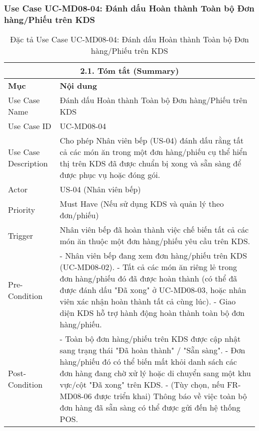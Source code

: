 \subsubsection{Use Case UC-MD08-04: Đánh dấu Hoàn thành Toàn bộ Đơn hàng/Phiếu trên KDS}
\begin{longtable}{|m{4cm}|p{11cm}|}
\caption{Đặc tả Use Case UC-MD08-04: Đánh dấu Hoàn thành Toàn bộ Đơn hàng/Phiếu trên KDS} \label{tab:uc_md08_04_final_v2} \\
\hline
\multicolumn{2}{|c|}{\textbf{2.1. Tóm tắt (Summary)}} \\
\hline
\textbf{Mục} & \textbf{Nội dung} \\
\hline
\endhead %
\hline
\endfoot %
\hline
\endlastfoot %
Use Case Name & Đánh dấu Hoàn thành Toàn bộ Đơn hàng/Phiếu trên KDS \\
\hline
Use Case ID & UC-MD08-04 \\
\hline
Use Case Description & Cho phép Nhân viên bếp (US-04) đánh dấu rằng tất cả các món ăn trong một đơn hàng/phiếu cụ thể hiển thị trên KDS đã được chuẩn bị xong và sẵn sàng để được phục vụ hoặc đóng gói. \\
\hline
Actor & US-04 (Nhân viên bếp) \\
\hline
Priority & Must Have (Nếu sử dụng KDS và quản lý theo đơn/phiếu) \\
\hline
Trigger & Nhân viên bếp đã hoàn thành việc chế biến tất cả các món ăn thuộc một đơn hàng/phiếu yêu cầu trên KDS. \\
\hline
Pre-Condition & - Nhân viên bếp đang xem đơn hàng/phiếu trên KDS (UC-MD08-02). \newline - Tất cả các món ăn riêng lẻ trong đơn hàng/phiếu đó đã được hoàn thành (có thể đã được đánh dấu "Đã xong" ở UC-MD08-03, hoặc nhân viên xác nhận hoàn thành tất cả cùng lúc). \newline - Giao diện KDS hỗ trợ hành động hoàn thành toàn bộ đơn hàng/phiếu. \\
\hline
Post-Condition & - Toàn bộ đơn hàng/phiếu trên KDS được cập nhật sang trạng thái "Đã hoàn thành" / "Sẵn sàng". \newline - Đơn hàng/phiếu đó có thể biến mất khỏi danh sách các đơn hàng đang chờ xử lý hoặc di chuyển sang một khu vực/cột "Đã xong" trên KDS. \newline - (Tùy chọn, nếu FR-MD08-06 được triển khai) Thông báo về việc toàn bộ đơn hàng đã sẵn sàng có thể được gửi đến hệ thống POS. \\
\hline

\end{longtable}
